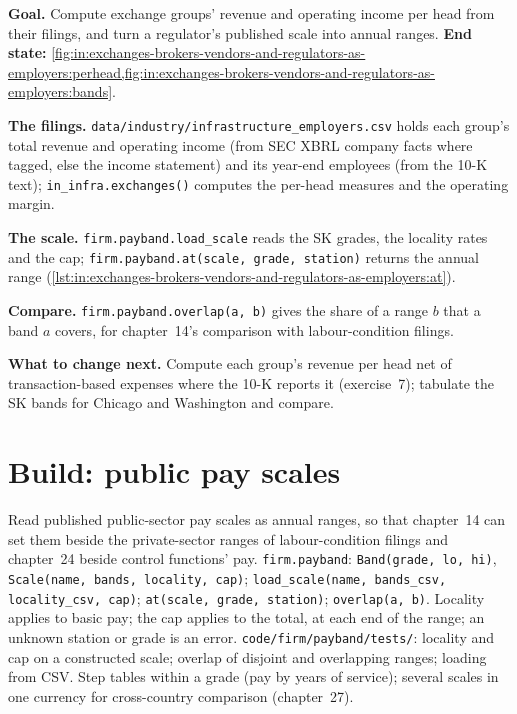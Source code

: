 \begin{tutorial}
\textbf{Goal.} Compute exchange groups' revenue and operating income per head from their filings, and turn a regulator's
published scale into annual ranges. \textbf{End state:}
\cref{fig:in:exchanges-brokers-vendors-and-regulators-as-employers:perhead,fig:in:exchanges-brokers-vendors-and-regulators-as-employers:bands}.
\begin{tutsteps}
\item \textbf{The filings.} \texttt{data/industry/infrastructure\_employers.csv} holds each group's total revenue and
operating income (from SEC XBRL company facts where tagged, else the income statement) and its year-end employees (from
the 10-K text); \texttt{in\_infra.exchanges()} computes the per-head measures and the operating margin.
\item \textbf{The scale.} \texttt{firm.payband.load\_scale} reads the SK grades, the locality rates and the cap;
\texttt{firm.payband.at(scale, grade, station)} returns the annual range
(\cref{lst:in:exchanges-brokers-vendors-and-regulators-as-employers:at}).
\label{lst:in:exchanges-brokers-vendors-and-regulators-as-employers:at}
\item \textbf{Compare.} \texttt{firm.payband.overlap(a, b)} gives the share of a range $b$ that a band $a$ covers, for
chapter~14's comparison with labour-condition filings.
\end{tutsteps}
\end{tutorial}

\textbf{What to change next.} Compute each group's revenue per head net of transaction-based expenses where the 10-K
reports it (exercise~7); tabulate the SK bands for Chicago and Washington and compare.

\section{Build: public pay scales}\label{bld:in:exchanges-brokers-vendors-and-regulators-as-employers:payband}

\begin{build}
 Read published public-sector pay scales as annual ranges, so that chapter~14 can set them beside the
private-sector ranges of labour-condition filings and chapter~24 beside control functions' pay.
 \texttt{firm.payband}: \texttt{Band(grade, lo, hi)}, \texttt{Scale(name, bands, locality, cap)};
\texttt{load\_scale(name, bands\_csv, locality\_csv, cap)}; \texttt{at(scale, grade, station)}; \texttt{overlap(a, b)}.
 Locality applies to basic pay; the cap applies to the total, at each end of the range; an unknown station
or grade is an error.
 \texttt{code/firm/payband/tests/}: locality and cap on a constructed scale; overlap of
disjoint and overlapping ranges; loading from CSV.
 Step tables within a grade (pay by years of service); several scales in one currency for cross-country
comparison (chapter~27).
\end{build}

